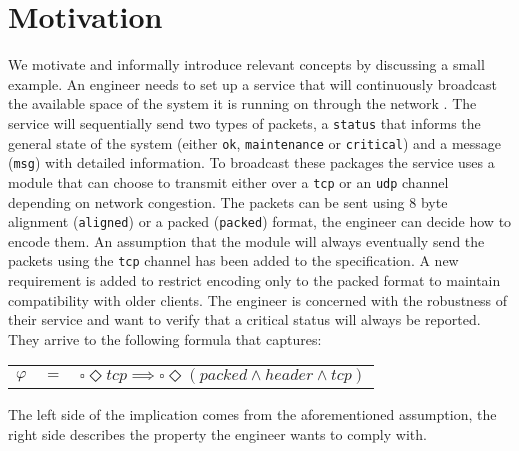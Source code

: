 \section{Motivation}\label{sec:motivation}
We motivate and informally introduce relevant concepts by discussing a small example.
An engineer needs to set up a service that will continuously broadcast the available space of the system it is running on through the network . The service will sequentially send two types of packets, a \texttt{status} that informs the general state of the system (either \texttt{ok}, \texttt{maintenance} or \texttt{critical}) and a message (\texttt{msg}) with detailed information. To broadcast these packages the service uses a module that can choose to transmit either over a \texttt{tcp} or an \texttt{udp} channel depending on network congestion. The packets can be sent using 8 byte alignment (\texttt{aligned}) or a packed (\texttt{packed}) format, the engineer can decide how to encode them. 
An assumption that the module will always eventually send the packets using the \texttt{tcp} channel has been added to the specification. A new requirement is added to restrict encoding only to the packed format to maintain compatibility with older clients. The engineer is concerned with the robustness of their service and want to verify that a critical status will always be reported. They arrive to the following formula that captures:

\begin{center}
	\begin{tabular}{ r c l }
		$\varphi$& $=$ &$\square \Diamond tcp\implies\square \Diamond (packed \wedge header \wedge tcp)$\\
	\end{tabular}
\end{center}
The left side of the implication comes from the aforementioned assumption, the right side describes the property the engineer wants to comply with.

